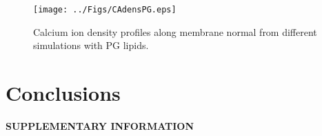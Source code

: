 \documentclass[aps,prl,superscriptaddress,twocolumn]{revtex4}
\begin{document}



\begin{figure}[]
  \centering
  \texttt{[image: ../Figs/CAdensPG.eps]}
  \caption{\label{CAdensPG}
    Calcium ion density profiles along membrane normal
    from different simulations with PG lipids.
  }
\end{figure}




\clearpage
\section{Conclusions}


%

\begin{acknowledgments}
\end{acknowledgments}
\newpage
\appendix
\begin{center}
{\bf SUPPLEMENTARY INFORMATION}
\end{center}



\end{document}
